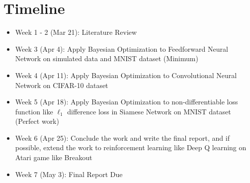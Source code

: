 \documentclass{article}
\begin{document}
\section{Timeline}
\begin{itemize}
\item Week 1 - 2 (Mar 21): Literature Review
\item Week 3 (Apr 4): Apply Bayesian Optimization to Feedforward Neural Network on simulated data and MNIST dataset (Minimum)
\item Week 4 (Apr 11): Apply Bayesian Optimization to Convolutional Neural Network on CIFAR-10 dataset
\item Week 5 (Apr 18): Apply Bayesian Optimization to non-differentiable loss function like $\ell_1$ difference loss in Siamese Network on MNIST dataset (Perfect work)
\item Week 6 (Apr 25): Conclude the work and write the final report, and if possible, extend the work to reinforcement learning like Deep Q learning on Atari game like Breakout
\item Week 7 (May 3): Final Report Due
\end{itemize}

\end{document}
